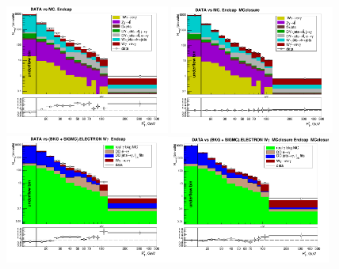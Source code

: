 \begin{figure}[htb]
  \begin{center}
   \includegraphics[width=0.48\textwidth]{../figs/figs_v11/ELECTRON_WGamma/PrepareYields/c_TotalDATAvsMC_Endcap__phoEt.png}
   \includegraphics[width=0.48\textwidth]{../figs/figs_v11/ELECTRON_WGamma/PrepareYields/c_TotalDATAvsMC_Endcap__phoEt_MCclosure.png}\\
   \includegraphics[width=0.48\textwidth]{../figs/figs_v11/ELECTRON_WGamma/PrepareYields/c_DATAvsBkgPlusSigMCc_ELECTRON_WGamma_TEMPL_CHISO_UNblind__Endcap__phoEt.png}\includegraphics[width=0.48\textwidth]{../figs/figs_v11/ELECTRON_WGamma/PrepareYields/c_DATAvsBkgPlusSigMCc_ELECTRON_WGamma_TEMPL_CHISO_UNblind_MCclosure__Endcap__phoEt_MCclosure.png}\\

\end{center}
\end{figure}
